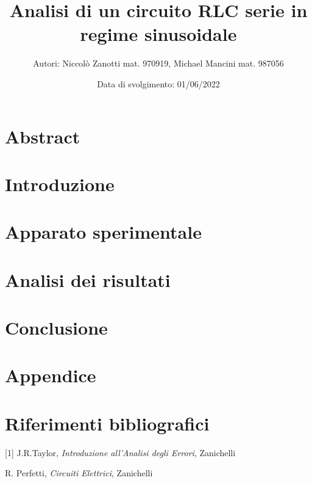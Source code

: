 \documentclass[11pt]{article}
\title{Analisi di un circuito RLC serie in regime sinusoidale}
\author{Autori: Niccolò Zanotti mat. 970919, Michael Mancini mat. 987056}
\date{Data di svolgimento: 01/06/2022}
\begin{document}
  \maketitle

  \section{Abstract}
    
 \section{Introduzione}
   
 \section{Apparato sperimentale}
   
 \section{Analisi dei risultati}
   
 \section{Conclusione}
  
 \section*{Appendice}
   
  \section*{Riferimenti bibliografici}
%  
  [1] J.R.Taylor, \emph{Introduzione all’Analisi degli Errori}, Zanichelli

  \noindent [2] R. Perfetti, \emph{Circuiti Elettrici}, Zanichelli



 
\end{document}
